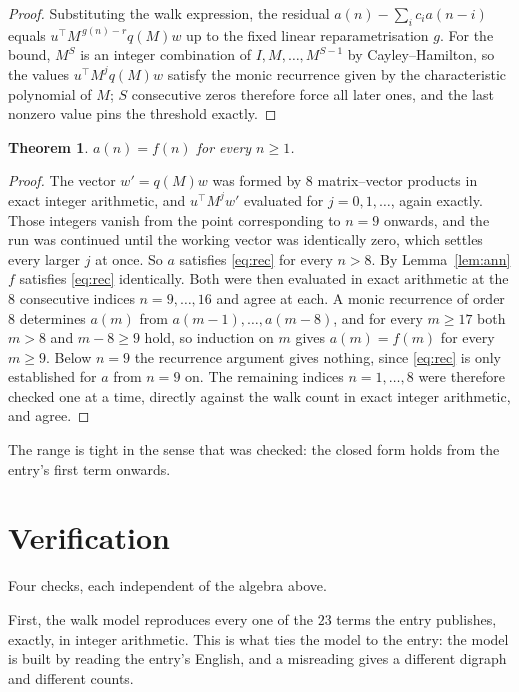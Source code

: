 \documentclass[11pt,a4paper]{article}
\theoremstyle{plain}
\newtheorem{theorem}{Theorem}
\theoremstyle{definition}
\begin{document}
\begin{proof}
Substituting the walk expression, the residual $a(n)-\sum_ic_ia(n-i)$ equals
$u^{\!\top}M^{\,g(n)-r}q(M)w$ up to the fixed linear reparametrisation $g$. For the bound,
$M^{S}$ is an integer combination of $I,M,\dots,M^{S-1}$ by Cayley--Hamilton, so the values
$u^{\!\top}M^{j}q(M)w$ satisfy the monic recurrence given by the characteristic polynomial of
$M$; $S$ consecutive zeros therefore force all later ones, and the last nonzero value pins the
threshold exactly.
\end{proof}

\begin{theorem}
$a(n)=f(n)$ for every $n\ge1$.
\end{theorem}

\begin{proof}
The vector $w'=q(M)w$ was formed by $8$ matrix--vector products in exact integer
arithmetic, and $u^{\!\top}M^{j}w'$ evaluated for $j=0,1,\dots$, again exactly. Those integers
vanish from the point corresponding to $n=9$ onwards, and the run was continued until the
working vector was identically zero, which settles every larger $j$ at once. So $a$ satisfies
\eqref{eq:rec} for every $n>8$. By Lemma~\ref{lem:ann} $f$ satisfies \eqref{eq:rec}
identically. Both were then evaluated in exact arithmetic at the $8$ consecutive indices
$n=9,\dots,16$ and agree at each. A monic recurrence of order $8$
determines $a(m)$ from $a(m-1),\dots,a(m-8)$, and for every $m\ge17$ both
$m>8$ and $m-8\ge9$ hold, so induction on $m$ gives $a(m)=f(m)$ for every
$m\ge9$.
Below $n=9$ the recurrence argument gives nothing, since \eqref{eq:rec} is only
established for $a$ from $n=9$ on. The remaining indices $n=1,\dots,8$ were
therefore checked one at a time, directly against the walk count in exact integer arithmetic,
and agree.
\end{proof}

The range is tight in the sense that was checked: the closed form holds from the entry's first term onwards.

\section{Verification}

Four checks, each independent of the algebra above.

First, the walk model reproduces every one of the $23$ terms the entry publishes,
exactly, in integer arithmetic. This is what ties the model to the entry: the model is built
by reading the entry's English, and a misreading gives a different digraph and different
counts.
\end{document}
